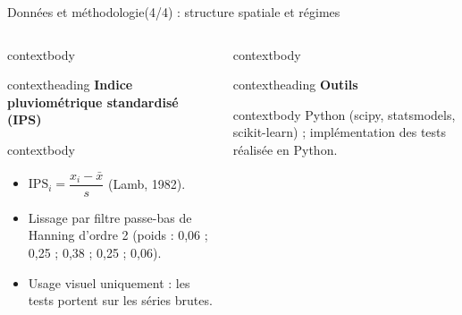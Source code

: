 \documentclass[aspectratio=169,11pt]{beamer}
\begin{document}
\begin{frame}{Données et méthodologie(4/4) : structure spatiale et régimes}
\begin{columns}[T,onlytextwidth]
      \begin{beamercolorbox}[wd=\linewidth,rounded=true,sep=0pt]{contextbody}
        \begin{beamercolorbox}[wd=\linewidth,ht=0.42cm,dp=0.08cm,leftskip=0.16cm]{contextheading}
          \bfseries Indice pluviométrique standardisé (IPS)
        \end{beamercolorbox}
        \begin{beamercolorbox}[wd=\linewidth,sep=0.08cm]{contextbody}
          \footnotesize
          \begin{itemize}
            \setlength\itemsep{0.06cm}
            \item $\mathrm{IPS}_i=\dfrac{x_i-\bar{x}}{s}$ (Lamb, 1982).
            \item Lissage par filtre passe-bas de Hanning d’ordre 2 (poids : 0,06 ; 0,25 ; 0,38 ; 0,25 ; 0,06).
            \item Usage visuel uniquement : les tests portent sur les séries brutes.
          \end{itemize}
        \end{beamercolorbox}
      \end{beamercolorbox}
      \vspace{0.14cm}
      \begin{beamercolorbox}[wd=\linewidth,rounded=true,sep=0pt]{contextbody}
        \begin{beamercolorbox}[wd=\linewidth,ht=0.42cm,dp=0.08cm,leftskip=0.16cm]{contextheading}
          \bfseries Outils
        \end{beamercolorbox}
        \begin{beamercolorbox}[wd=\linewidth,sep=0.08cm]{contextbody}
          \footnotesize
          Python (scipy, statsmodels, scikit-learn) ; implémentation des tests réalisée en Python.
        \end{beamercolorbox}
      \end{beamercolorbox}
  \end{columns}
  \vspace{-0.12cm}
\end{frame}
\end{document}
